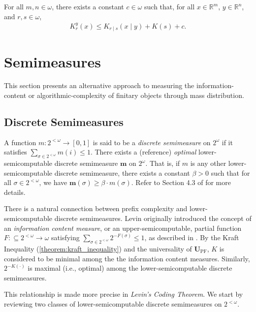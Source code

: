 \begin{lemma}
    \label{oracle_access_to_conditional}
    For all $m, n \in \omega$, there exists a constant $c \in \omega$ such that, for all $x \in \mathbb{R}^m$, $y \in \mathbb{R}^n$, and $r, s \in \omega$,
    \begin{align*}
        K^y_r(x) \leq K_{r \mid s}(x \mid y) + K(s) + c.
    \end{align*}
\end{lemma}

\section{Semimeasures} \label{section:Semimeasures}

This section presents an alternative approach to measuring the information-content or algorithmic-complexity of finitary objects through mass distribution. 

\subsection{Discrete Semimeasures}
A function $m: 2^{<\omega} \to [0, 1]$ is said to be a \textit{discrete semimeasure} on $2^\omega$ if it satisfies $\sum_{\sigma \in 2^{<\omega}} m(i) \leq 1$. There exists a (reference) \textit{optimal} lower-semicomputable discrete semimeasure $\mathbf{m}$ on $2^\omega$. That is, if $m$ is any other lower-semicomputable discrete semimeasure, there exists a constant $\beta > 0$ such that for all $\sigma \in 2^{<\omega}$, we have $\mathbf{m}(\sigma) \geq \beta \cdot m(\sigma)$. Refer to Section 4.3 of \cite{LV08} for more details. 

There is a natural connection between prefix complexity and lower-semicomputable discrete semimeasures. Levin originally introduced the concept of an \textit{information content measure}, or an upper-semicomputable, partial function $F : \subseteq 2^{<\omega} \to \omega$ satisfying $\sum_{\sigma \in 2^{<\omega}} 2^{-F(\sigma)} \leq 1$, as described in \cite{DH10}. By the Kraft Inequality (\ref{theorem:kraft_inequality}) and the universality of $\mathbf{U}_{\operatorname{PF}}$, $K$ is considered to be minimal among the the information content measures. Similarly, $2^{-K(\cdot)}$ is maximal (i.e., optimal) among the lower-semicomputable discrete semimeasures.

This relationship is made more precise in \textit{Levin's Coding Theorem}. We start by reviewing two classes of lower-semicomputable discrete semimeasures on $2^{<\omega}$. 

